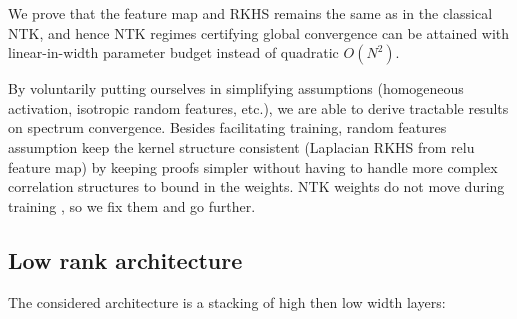 We prove that the feature map and RKHS remains the same as in the classical NTK, and hence NTK regimes certifying global convergence can be attained with linear-in-width parameter budget instead of quadratic $O(N^2)$.

By voluntarily putting ourselves in simplifying assumptions (homogeneous activation, isotropic random features, etc.), we are able to derive tractable results on spectrum convergence.
Besides facilitating training, random features assumption keep the kernel structure consistent (Laplacian RKHS from relu feature map) by keeping proofs 
simpler without having to handle more complex correlation structures to bound in the weights. NTK weights do not move during training \cite{jacot2018neural}, so
we fix them and go further.


\subsection*{Low rank architecture }
The considered architecture is a stacking of high then low width layers:
